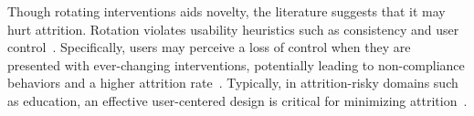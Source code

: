 Though rotating interventions aids novelty, the literature suggests that it may hurt attrition. Rotation violates usability heuristics such as consistency and user control~\cite{nielsen199510}. Specifically, users may perceive a loss of control when they are presented with ever-changing interventions, %
potentially leading to non-compliance behaviors and a higher attrition
rate~\cite{coco2018hiniker}. %
Typically, in attrition-risky domains such as education, an effective user-centered design is critical for minimizing attrition~\cite{Angelino2007learning}. %








